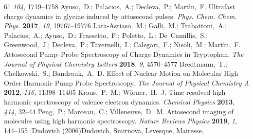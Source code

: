 \documentclass[journal=jacsat,manuscript=article]{achemso}
\begin{document}
\begin{mcitethebibliography}{61}
  \emph{104}, 1719--1758\relax
\mciteBstWouldAddEndPuncttrue
\mciteSetBstMidEndSepPunct{\mcitedefaultmidpunct}
{\mcitedefaultendpunct}{\mcitedefaultseppunct}\relax
\EndOfBibitem
{}
Ayuso,~D.; Palacios,~A.; Decleva,~P.; Mart\'{\i}n,~F. Ultrafast charge dynamics
  in glycine induced by attosecond pulses. \emph{Phys. Chem. Chem. Phys.}
  \textbf{2017}, \emph{19}, 19767--19776\relax
\mciteBstWouldAddEndPuncttrue
\mciteSetBstMidEndSepPunct{\mcitedefaultmidpunct}
{\mcitedefaultendpunct}{\mcitedefaultseppunct}\relax
\EndOfBibitem
{}
Lara-Astiaso,~M.; Galli,~M.; Trabattoni,~A.; Palacios,~A.; Ayuso,~D.;
  Frassetto,~F.; Poletto,~L.; De~Camillis,~S.; Greenwood,~J.; Decleva,~P.;
  Tavernelli,~I.; Calegari,~F.; Nisoli,~M.; Mart\'{\i}n,~F. Attosecond
  Pump–Probe Spectroscopy of Charge Dynamics in Tryptophan. \emph{The Journal
  of Physical Chemistry Letters} \textbf{2018}, \emph{9}, 4570--4577\relax
\mciteBstWouldAddEndPuncttrue
\mciteSetBstMidEndSepPunct{\mcitedefaultmidpunct}
{\mcitedefaultendpunct}{\mcitedefaultseppunct}\relax
\EndOfBibitem
{}
Bredtmann,~T.; Chelkowski,~S.; Bandrauk,~A.~D. Effect of Nuclear Motion on
  Molecular High Order Harmonic Pump Probe Spectroscopy. \emph{The Journal of
  Physical Chemistry A} \textbf{2012}, \emph{116}, 11398--11405\relax
\mciteBstWouldAddEndPuncttrue
\mciteSetBstMidEndSepPunct{\mcitedefaultmidpunct}
{\mcitedefaultendpunct}{\mcitedefaultseppunct}\relax
\EndOfBibitem
{}
Kraus,~P.~M.; Wörner,~H.~J. Time-resolved high-harmonic spectroscopy of
  valence electron dynamics. \emph{Chemical Physics} \textbf{2013}, \emph{414},
  32--44\relax
\mciteBstWouldAddEndPuncttrue
\mciteSetBstMidEndSepPunct{\mcitedefaultmidpunct}
{\mcitedefaultendpunct}{\mcitedefaultseppunct}\relax
\EndOfBibitem
{}
Peng,~P.; Marceau,~C.; Villeneuve,~D.~M. Attosecond imaging of molecules using
  high harmonic spectroscopy. \emph{Nature Reviews Physics} \textbf{2019},
  \emph{1}, 144--155\relax
\mciteBstWouldAddEndPuncttrue
\mciteSetBstMidEndSepPunct{\mcitedefaultmidpunct}
{\mcitedefaultendpunct}{\mcitedefaultseppunct}\relax
\EndOfBibitem
\bibitem[Dudovich (2006)Dudovich, Smirnova, Levesque, Mairesse,

\end{mcitethebibliography}
\end{document}
